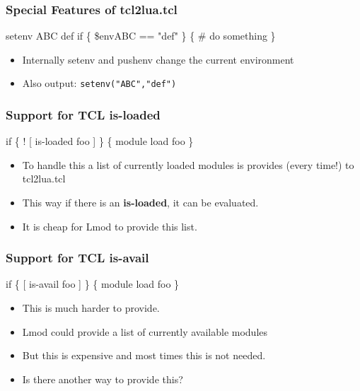 \documentclass{beamer}
\begin{document}
\begin{frame}[fragile]
    \frametitle{Special Features of tcl2lua.tcl}
 {\tiny
    \begin{semiverbatim}
setenv ABC def
if \{ \$env{ABC} == "def" \} \{
     # do something
\}
    \end{semiverbatim}
}
  \begin{itemize}
    \item Internally setenv and pushenv change the current environment
    \item Also output: \texttt{setenv("ABC","def")}
  \end{itemize}

\end{frame}



\begin{frame}[fragile]
    \frametitle{Support for TCL is-loaded}
 {\tiny
    \begin{semiverbatim}
if \{ ! [ is-loaded foo ] \} \{
   module load foo
\}
        
    \end{semiverbatim}
}
  \begin{itemize}
    \item To handle this a list of currently loaded modules is
      provides (every time!) to tcl2lua.tcl
    \item This way if there is an \textbf{is-loaded}, it can be evaluated.
    \item It is cheap for Lmod to provide this list.
  \end{itemize}
\end{frame}

\begin{frame}[fragile]
    \frametitle{Support for TCL is-avail}
 {\tiny
    \begin{semiverbatim}
if \{ [ is-avail foo ] \} \{
   module load foo
\}
    \end{semiverbatim}
}
  \begin{itemize}
    \item This is much harder to provide.
    \item Lmod could provide a list of currently available modules
    \item But this is expensive and most times this is not needed.
    \item Is there another way to provide this?
  \end{itemize}
\end{frame}
\end{document}
